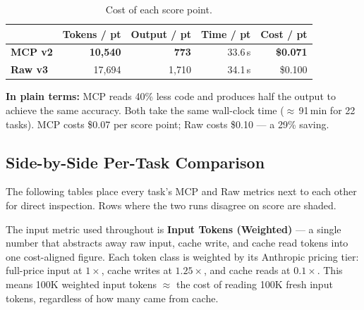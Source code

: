 \begin{table}[h]
\centering
\caption{Cost of each score point.}\label{tab:efficiency}
\begin{tabular}{lrrrr}
\toprule
& \textbf{Tokens / pt} & \textbf{Output / pt} & \textbf{Time / pt} & \textbf{Cost / pt} \\
\midrule
\textbf{MCP v2} & \textbf{10{,}540}  & \textbf{773} & 33.6\,s & \textbf{\$0.071} \\
\textbf{Raw v3} & 17{,}694            & 1{,}710      & 34.1\,s & \$0.100 \\
\bottomrule
\end{tabular}
\end{table}

\noindent
\textbf{In plain terms:} MCP reads 40\% less code and produces
half the output to achieve the same accuracy.
Both take the same wall-clock time ($\approx$\,91\,min for 22 tasks).
MCP costs \$0.07 per score point; Raw costs \$0.10 --- a 29\% saving.

\subsection{Side-by-Side Per-Task Comparison}\label{sec:side-by-side}

The following tables place every task's MCP and Raw metrics next to each
other for direct inspection.  Rows where the two runs disagree on score
are shaded.

The input metric used throughout is \textbf{Input Tokens (Weighted)}
--- a single number that abstracts away raw input, cache write, and
cache read tokens into one cost-aligned figure.
Each token class is weighted by its Anthropic pricing tier:
full-price input at $1\times$, cache writes at $1.25\times$, and
cache reads at $0.1\times$.
This means 100K weighted input tokens $\approx$ the cost of reading
100K fresh input tokens, regardless of how many came from cache.

